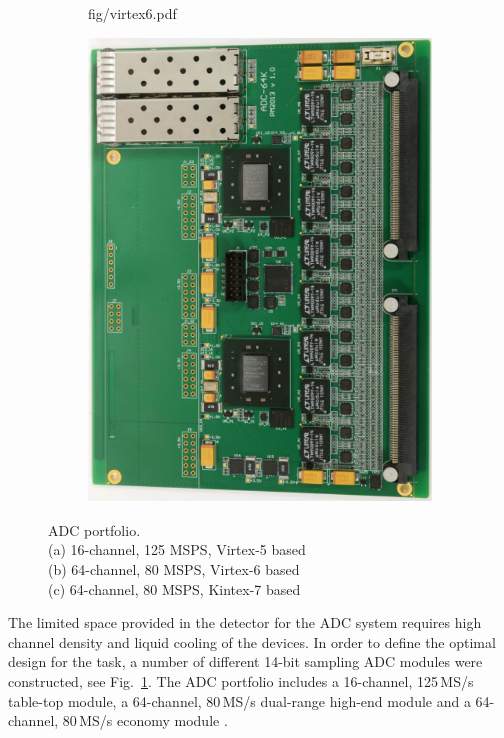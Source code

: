 \documentclass[12pt,a4paper, twocolumn]{article}
\newcommand{\Reffig}[1]{Fig.~\ref{#1}}
\begin{document}
\begin{figure} [htb]
\begin{subfigure}[b]{0.3\linewidth}
{fig/virtex6.pdf}
\caption{}
\end{subfigure}
\begin{subfigure}[b]{0.33\linewidth}
\includegraphics[width=\linewidth]
{fig/kintex7.pdf}
\caption{}
\end{subfigure}
\caption{ADC portfolio. \\
(a) 16-channel, 125 MSPS, Virtex-5 based\\
(b) 64-channel, 80 MSPS, Virtex-6 based\\
(c) 64-channel, 80 MSPS, Kintex-7 based}
\label{fig:sadc:board}
\end{figure}
The limited space provided in the detector for the ADC system requires high channel density and liquid cooling of the devices. 
In order to define the optimal design for the task, a number of different 14-bit sampling ADC modules were constructed, see \Reffig{fig:sadc:board}. The ADC portfolio includes a 16-channel, 125\,MS/s table-top module, a 64-channel, 80\,MS/s dual-range high-end module and a 64-channel, 80\,MS/s economy module \cite{kavatsyuk}. 
\end{document}
